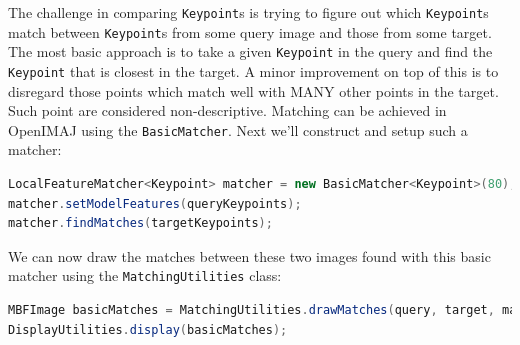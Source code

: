 The challenge in comparing \verb+Keypoint+s is trying to figure out which \verb+Keypoint+s match 
between \verb+Keypoint+s from some query image and those from some target. The most basic approach 
is to take a given \verb+Keypoint+ in the query and find the \verb+Keypoint+ that is closest in the 
target. A minor improvement on top of this is to disregard those points which match well with MANY
other points in the target. Such point are considered non-descriptive. Matching can be achieved in 
OpenIMAJ using the \verb+BasicMatcher+. Next we'll construct and setup such a matcher:
\begin{lstlisting}[language=java]
LocalFeatureMatcher<Keypoint> matcher = new BasicMatcher<Keypoint>(80);
matcher.setModelFeatures(queryKeypoints);
matcher.findMatches(targetKeypoints);
\end{lstlisting}
We can now draw the matches between these two images found with this basic matcher using the 
\verb+MatchingUtilities+ class:
\begin{lstlisting}[language=java]
MBFImage basicMatches = MatchingUtilities.drawMatches(query, target, matcher.getMatches(), RGBColour.RED);
DisplayUtilities.display(basicMatches);
\end{lstlisting}
